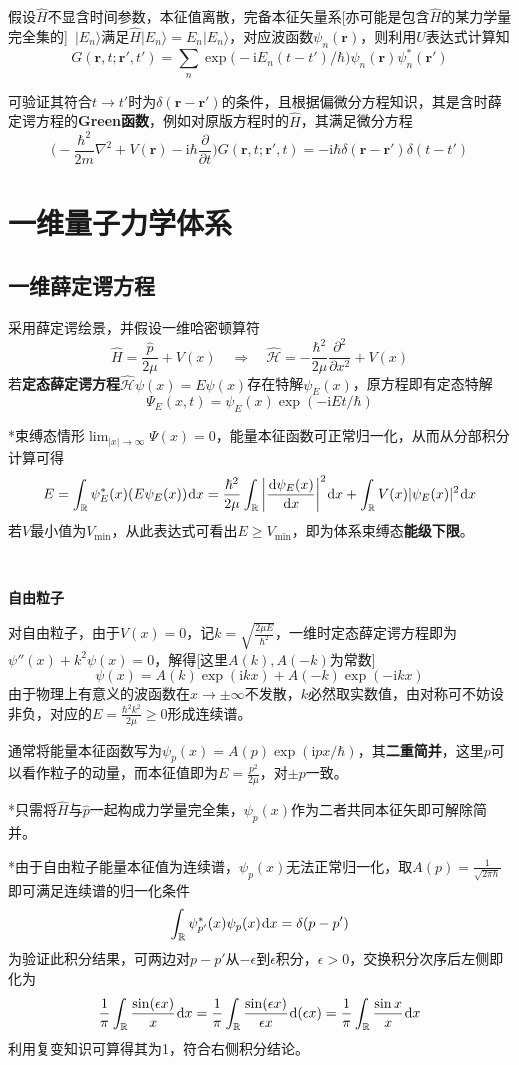 \documentclass[a4paper,UTF8,fontset=windows]{ctexart}
\newcommand*{\dr}{\hspace{0.07em}\mathrm{d}}
\newcommand*{\ir}{\mathrm{i}}
\newcommand*{\ket}[1]{|#1\rangle}
\newcommand*{\br}{\mathbf{r}}
\begin{document}
假设$\hat{H}$不显含时间参数，本征值离散，完备本征矢量系[亦可能是包含$\hat{H}$的某力学量完全集的]\ $\ket{E_n}$满足$\hat{H}\ket{E_n}=E_n\ket{E_n}$，对应波函数$\psi_n(\br)$，则利用$\hat{U}$表达式计算知
$$G(\br,t;\br',t')=\sum_n\exp\big(-\ir E_n(t-t')/\hbar\big)\psi_n(\br)\psi_n^*(\br')$$

可验证其符合$t\to t'$时为$\delta(\br-\br')$的条件，且根据偏微分方程知识，其是含时薛定谔方程的\textbf{Green函数}，例如对原版方程时的$\hat{H}$，其满足微分方程
$$\bigg(-\frac{\hbar^2}{2m}\nabla^2+V(\br)-\ir\hbar\frac{\partial}{\partial t}\bigg)G(\br,t;\br',t)=-\ir\hbar\delta(\br-\br')\delta(t-t')$$

\section{一维量子力学体系}
\subsection{一维薛定谔方程}
采用薛定谔绘景，并假设一维哈密顿算符
$$\hat{H}=\frac{\hat{p}}{2\mu}+V(x)\quad\Rightarrow\quad\hat{\mathcal{H}}=-\frac{\hbar^2}{2\mu}\frac{\partial^2}{\partial x^2}+V(x)$$
若\textbf{定态薛定谔方程}$\hat{\mathcal{H}}\psi(x)=E\psi(x)$存在特解$\psi_E(x)$，原方程即有定态特解
$$\Psi_E(x,t)=\psi_E(x)\exp(-\ir Et/\hbar)$$

*束缚态情形$\lim_{|x|\to\infty}\Psi(x)=0$，能量本征函数可正常归一化，从而从分部积分计算可得
$$E=\int_\mathbb{R}\psi_E^*(x)(E\psi_E(x))\dr x=\frac{\hbar^2}{2\mu}\int_\mathbb{R}\bigg|\frac{\dr\psi_E(x)}{\dr x}\bigg|^2\dr x+\int_\mathbb{R}V(x)|\psi_E(x)|^2\dr x$$
若$V$最小值为$V_{\min}$，从此表达式可看出$E\ge V_{\min}$，即为体系束缚态\textbf{能级下限}。

\

\textbf{自由粒子}

对自由粒子，由于$V(x)=0$，记$k=\sqrt{\frac{2\mu E}{\hbar^2}}$，一维时定态薛定谔方程即为$\psi''(x)+k^2\psi(x)=0$，解得[这里$A(k),A(-k)$为常数]
$$\psi(x)=A(k)\exp(\ir kx)+A(-k)\exp(-\ir kx)$$
由于物理上有意义的波函数在$x\to\pm\infty$不发散，$k$必然取实数值，由对称可不妨设非负，对应的$E=\frac{\hbar^2k^2}{2\mu}\ge0$形成连续谱。

通常将能量本征函数写为$\psi_p(x)=A(p)\exp(\ir px/\hbar)$，其\textbf{二重简并}，这里$p$可以看作粒子的动量，而本征值即为$E=\frac{p^2}{2\mu}$，对$\pm p$一致。

*只需将$\hat{H}$与$\hat{p}$一起构成力学量完全集，$\psi_p(x)$作为二者共同本征矢即可解除简并。

*由于自由粒子能量本征值为连续谱，$\psi_p(x)$无法正常归一化，取$A(p)=\frac{1}{\sqrt{2\pi\hbar}}$即可满足连续谱的归一化条件
$$\int_\mathbb{R}\psi^*_{p'}(x)\psi_p(x)\dr x=\delta(p-p')$$
为验证此积分结果，可两边对$p-p'$从$-\epsilon$到$\epsilon$积分，$\epsilon>0$，交换积分次序后左侧即化为
$$\frac{1}{\pi}\int_\mathbb{R}\frac{\sin(\epsilon x)}{x}\dr x=\frac{1}{\pi}\int_\mathbb{R}\frac{\sin(\epsilon x)}{\epsilon x}\dr(\epsilon x)=\frac{1}{\pi}\int_{\mathbb{R}}\frac{\sin x}{x}\dr x$$
利用复变知识可算得其为1，符合右侧积分结论。
\end{document}
